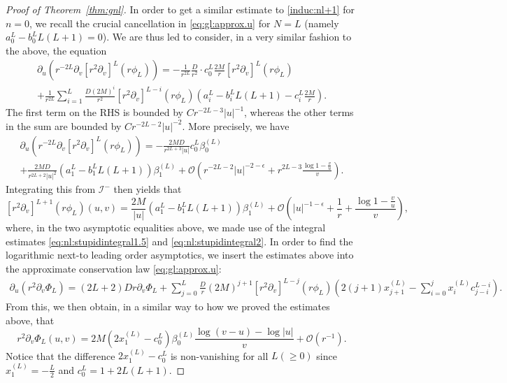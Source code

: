 \documentclass[11pt,english]{article}
\numberwithin{equation}{section}
\theoremstyle{remark}
\theoremstyle{plain}
\newenvironment{nalign}{
    \begin{equation}
    \begin{aligned}
}{
    \end{aligned}
    \end{equation}
    \ignorespacesafterend
}
\theoremstyle{remark}
\newcommand{\pu}{\partial_u}
\newcommand{\pv}{\partial_v}
\renewcommand{\(}{\left(}
\renewcommand{\)}{\right)}
\begin{document}
\begin{proof}[Proof of Theorem~\ref{thm:gnl}]
In order to get a similar  estimate to \eqref{induc:nl+1} for $n=0$, we recall the crucial cancellation in \eqref{eq:gl:approx.u} for $N=L$ (namely $a_0^L-b_0^LL(L+1)=0$). We are thus led to consider, in a very similar fashion to the above, the equation
\begin{multline}\label{qlneli}
\pu(r^{-2L}\pv[r^2\pv]^{L}(r\phi_L))=-\frac{1}{r^{2L}}\frac{D}{r^2}\cdot c_0^L\frac{2M}{r}[r^2\pv]^L(r\phi_L)\\
+\frac{1}{r^{2L}}\sum_{i=1}^L\frac{D(2M)^i}{r^2}[r^2\pv]^{L-i}(r\phi_L)\left(a_i^{L}-b_i^{L}L(L+1)-c_i^{L}\frac{2M}{r}\right).
\end{multline}
The first term on the RHS is bounded by $Cr^{-2L-3}|u|^{-1}$, whereas the other terms in the sum are bounded by $C{r^{-2L-2}|u|^{-2}}$. More precisely, we have
\begin{multline}
\pu(r^{-2L}\pv[r^2\pv]^{L}(r\phi_L))=-\frac{2MD}{r^{2L+3}|u|} c_0^L\beta_0^{(L)}\\
+\frac{2MD}{r^{2L+2}|u|^2}\left(a_1^L-b_1^L L(L+1)\right)\beta_1^{(L)}+\mathcal{O}\left(r^{-2L-2}|u|^{-2-\epsilon}+r^{2L-3}\frac{\log 1-\frac vu}{v}\right).
\end{multline}
Integrating this from $\mathcal{I}^-$ then yields that
\begin{equation}\label{tul}
[r^2\pv]^{L+1}(r\phi_L)(u,v)=\frac{2M}{|u|}\left(a_1^L-b_1^L L(L+1)\right)\beta_1^{(L)}
+\mathcal{O}\left(|u|^{-1-\epsilon}+\frac 1 r +\frac{\log 1-\frac{v}{u}}{v}\right),
\end{equation}
where, in the two asymptotic equalities above, we made use of the integral estimates \eqref{eq:nl:stupidintegral1.5} and \eqref{eq:nl:stupidintegral2}.
In order to find the logarithmic next-to leading order asymptotics, we insert the estimates above into the approximate conservation law \eqref{eq:gl:approx.u}:
\begin{nalign}
\pu(r^2\pv\Phi_L)=(2L+2)Dr \pv\Phi_L
+\sum_{j=0}^L\frac{D}{r}(2M)^{j+1}[r^2\pv]^{L-j}(r\phi_{L})\left(2(j+1)x^{(L)}_{j+1}-\sum_{i=0}^j x_i^{(L)} c_{j-i}^{L-i}\right) .
\end{nalign}
From this, we then obtain, in a similar way to how we proved the estimates above, that
\begin{equation}\label{tul2}
r^2\pv\Phi_L(u,v)=2M(2x_1^{(L)}-c_0^L)\beta_0^{(L)}\frac{\log(v-u)-\log|u|}{v}+\mathcal{O}(r^{-1}).
\end{equation}
Notice that the difference $2x_1^{(L)}-c_0^L$ is non-vanishing for all $L(\geq0)$ since $x_1^{(L)}=-\frac L2$ and $c_0^L=1+2L(L+1)$.


\end{proof}
\end{document}
